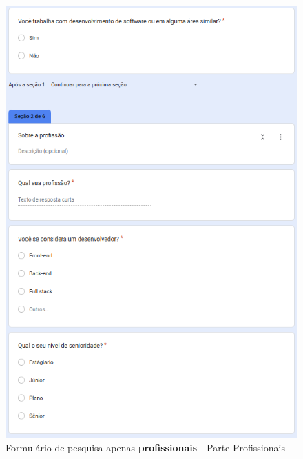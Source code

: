 \begin{figure}[!h]
	\begin{center}
	    \includegraphics[scale=0.6]{figs/Form/02.png}
	\end{center}
	\caption{\label{AP_PPr}Formulário de pesquisa apenas \textbf{profissionais} - Parte Profissionais}
\end{figure}

\newpage

